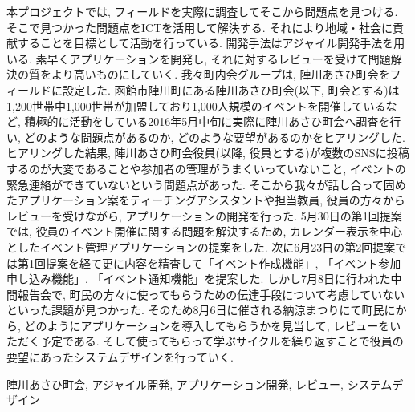 \begin{jabstract}
\quad 本プロジェクトでは, フィールドを実際に調査してそこから問題点を見つける. そこで見つかった問題点をICTを活用して解決する. それにより地域・社会に貢献することを目標として活動を行っている. 開発手法はアジャイル開発手法を用いる. 素早くアプリケーションを開発し, それに対するレビューを受けて問題解決の質をより高いものにしていく.
我々町内会グループは, 陣川あさひ町会をフィールドに設定した. 函館市陣川町にある陣川あさひ町会(以下, 町会とする)は1,200世帯中1,000世帯が加盟しており1,000人規模のイベントを開催しているなど, 積極的に活動をしている2016年5月中旬に実際に陣川あさひ町会へ調査を行い, どのような問題点があるのか, どのような要望があるのかをヒアリングした. ヒアリングした結果, 陣川あさひ町会役員(以降, 役員とする)が複数のSNSに投稿するのが大変であることや参加者の管理がうまくいっていないこと, イベントの緊急連絡ができていないという問題点があった. そこから我々が話し合って固めたアプリケーション案をティーチングアシスタントや担当教員, 役員の方々からレビューを受けながら, アプリケーションの開発を行った.
5月30日の第1回提案では, 役員のイベント開催に関する問題を解決するため, カレンダー表示を中心としたイベント管理アプリケーションの提案をした. 次に6月23日の第2回提案では第1回提案を経て更に内容を精査して「イベント作成機能」, 「イベント参加申し込み機能」, 「イベント通知機能」を提案した. しかし7月8日に行われた中間報告会で,
町民の方々に使ってもらうための伝達手段について考慮していないといった課題が見つかった. そのため8月6日に催される納涼まつりにて町民にから, どのようにアプリケーションを導入してもらうかを見当して, レビューをいただく予定である. そして使ってもらって学ぶサイクルを繰り返すことで役員の要望にあったシステムデザインを行っていく.

\begin{jkeyword}
陣川あさひ町会, アジャイル開発, アプリケーション開発, レビュー, システムデザイン
\end{jkeyword}
\end{jabstract}
​
